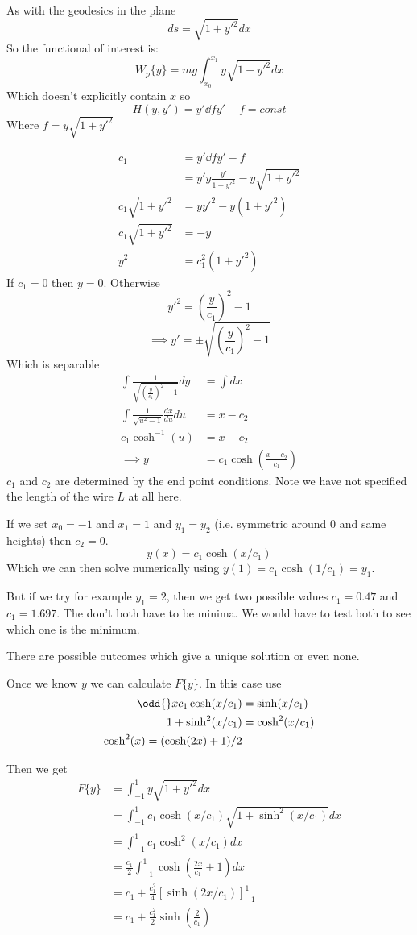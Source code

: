 \documentclass{X:/Documents/Coding/Latex/myassignment}
\begin{document}
As with the geodesics in the plane
\[ds = \sqrt{1+y'^2} dx\]
So the functional of interest is:
\[W_p\{y\} = mg \int_{x_0}^{x_1} y \sqrt{1+y'^2} dx\]
Which doesn't explicitly contain $x$ so 
\[H(y,y') = y'\dd f{y'} - f = const\]
Where $f = y\sqrt{1+y'^2}$

\begin{align*}
	c_1 &= y'\dd f{y'} - f \\
	&=y' y\frac{y'}{1+y'^2} - y\sqrt{1+y'^2}\\
	c_1 \sqrt{1+y'^2} &= yy'^2 - y(1+y'^2)\\
	c_1 \sqrt{1+y'^2} &= -y\\
	y^2 &= c_1^2 (1+y'^2)
\end{align*}
If $c_1 = 0$ then $y = 0$.
Otherwise
\[y'^2 = \left(\frac{y}{c_1} \right)^2- 1\]
\[\implies y' = \pm\sqrt{\left(\frac{y}{c_1} \right)^2- 1}\]
Which is separable
\begin{align*}
	\int \frac{1}{\sqrt{\left(\frac{y}{c_1} \right)^2- 1}} dy &= \int dx\\
	\int \frac{1}{\sqrt{u^2-1}} \frac{dx}{du} du&= x -c_2\\
	c_1 \cosh^{-1}(u) &= x - c_2\\
	\implies y &= c_1 \cosh\left(\frac{x - c_2}{c_1}\right)
\end{align*}
$c_1$ and $c_2$ are determined by the end point conditions. Note we have not specified the length of the wire $L$ at all here.

If we set $x_0 = -1$ and $x_1 = 1$ and $y_1=y_2$ (i.e. symmetric around $0$ and same heights) then $c_2 = 0$.
\[y(x) = c_1 \cosh (x/c_1)\]
Which we can then solve numerically using $y(1) = c_1 \cosh(1/c_1) = y_1$.

But if we try for example $y_1 = 2$, then we get two possible values $c_1 = 0.47$ and $c_1 = 1.697$. The don't both have to be minima.
We would have to test both to see which one is the minimum.

There are possible outcomes which give a unique solution or even none.


Once we know $y$ we can calculate $F\{y\}$. In this case use
\begin{align*}
	\odd{}x c_1\cosh(x/c_1) &= \sinh(x/c_1)\\
	1 + \sinh^2(x/c_1) &= \cosh^2(x/c_1)\\
	\cosh^2(x) = (\cosh(2x)+1)/2
\end{align*}

Then we get
\begin{align*}
	F\{y\} &= \int_{-1}^1 y\sqrt{1+y'^2} dx\\
	&= \int_{-1}^1 c_1\cosh(x/c_1) \sqrt{1+\sinh^2(x/c_1)} dx\\
	&= \int_{-1}^1 c_1\cosh^2(x/c_1)dx\\
	&= \frac{c_1}{2} \int_{-1}^1 \cosh(\frac{2x}{c_1} + 1) dx\\
	&= c_1 + \frac{c_1^2}{4}[\sinh(2x/c_1)]_{-1}^1\\
	&= c_1 + \frac{c_1^2}{2}\sinh(\frac{2}{c_1})
\end{align*}
\end{document}
